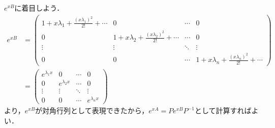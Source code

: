 $e^{xB}$に着目しよう．
\begin{align*}
    e^{xB} &= 
    \begin{pmatrix}
        1+x\lambda_1+\frac{(x\lambda_1)^2}{2!}+\cdots & 0 & \cdots & 0 \\
        0 & 1+x\lambda_2+\frac{(x\lambda_2)^2}{2!}+\cdots & \cdots & 0 \\
        \vdots & \vdots& \ddots & \vdots \\
        0 & 0 & \cdots & 1+x\lambda_n+\frac{(x\lambda_n)^2}{2!}+\cdots
    \end{pmatrix} \\
    &= 
    \begin{pmatrix}
        e^{\lambda_1x} & 0 & \cdots & 0 \\
        0 & e^{\lambda_2x} & \cdots & 0 \\
        \vdots & \vdots & \ddots & \vdots \\
        0 & 0 & \cdots & e^{\lambda_nx}
    \end{pmatrix}
\end{align*}
より，$e^{xB}$が対角行列として表現できたから，$e^{xA} = Pe^{xB}P^{-1}$として計算すればよい．

